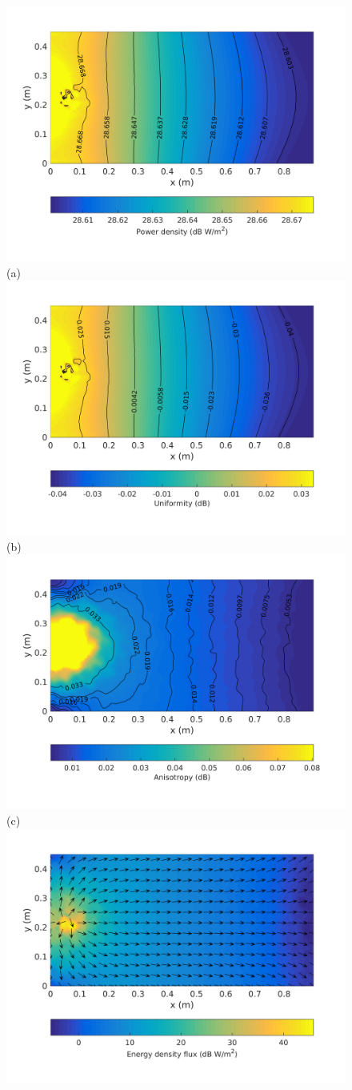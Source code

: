 \documentclass[a4paper]{article}
\numberwithin{equation}{section}
\begin{document}
\begin{figure}[ht]
\begin{center}
\includegraphics[trim={0 8mm 0 12mm},clip,width=0.52\linewidth]{figures/SDM_3D_SU_PowerDensityMap}\\
{\footnotesize (a)}\\
\vspace{2mm}
\includegraphics[trim={0 8mm 0 12mm},clip,width=0.52\linewidth]{figures/SDM_3D_SU_EnergyDensityUniformityMap}\\
{\footnotesize (b)}\\
\vspace{2mm}
\includegraphics[trim={0 8mm 0 12mm},clip,width=0.52\linewidth]{figures/SDM_3D_SU_EnergyDensityAnisotropyMap}\\
{\footnotesize (c)}\\
\vspace{2mm}
\includegraphics[trim={0 8mm 0 12mm},clip,width=0.52\linewidth]{figures/SDM_3D_SU_EnergyDensityFluxMap}\\

\end{center}
\end{figure}
\end{document}
